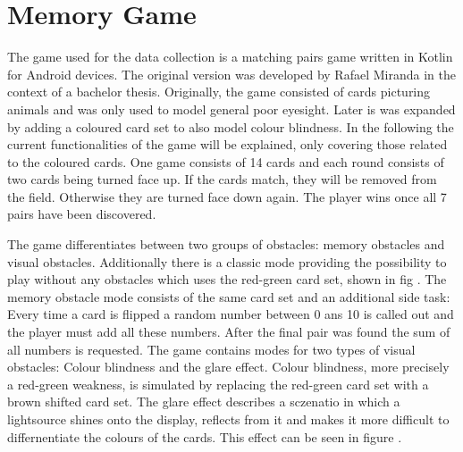 \chapter{Memory Game}


The game used for the data collection is a matching pairs game written in Kotlin for Android devices. The original version was developed by Rafael Miranda  in the context of a bachelor thesis. Originally, the game consisted of cards picturing animals and was only used to model general poor eyesight. Later is was expanded by adding a coloured card set to also model colour blindness. In the following the current functionalities of the game will be explained, only covering those related to the coloured cards. One game consists of 14 cards and each round consists of two cards being turned face up. If the cards match, they will be removed from the field. Otherwise they are turned face down again. The player wins once all 7 pairs have been discovered. 

The game differentiates between two groups of obstacles: memory obstacles and visual obstacles. Additionally there is a classic mode providing the possibility to play without any obstacles which uses the red-green card set, shown in fig . The memory obstacle mode consists of the same card set and an additional side task: Every time a card is flipped a random number between 0 ans 10 is called out and the player must add all these numbers. After the final pair was found the sum of all numbers is requested. The game contains modes for two types of visual obstacles: Colour blindness and the glare effect. Colour blindness, more precisely a red-green weakness, is simulated by replacing the red-green card set with a brown shifted card set. The glare effect describes a sczenatio in which a lightsource shines onto the display, reflects from it and makes it more difficult to differnentiate the colours of the cards. This effect can be seen in figure . 

